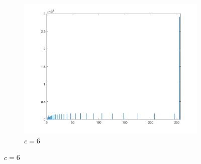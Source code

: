 \documentclass{article}
\begin{document}
\begin{enumerate}[label=(\alph*)]
\begin{figure}[!htb]
\begin{subfigure}[b]{0.3\textwidth}
            \includegraphics[width=\textwidth]{img/hist_ILT6.png}
            \caption{$c = 6$}
        \end{subfigure}
        
        

\end{figure}
\end{enumerate}
\end{document}
